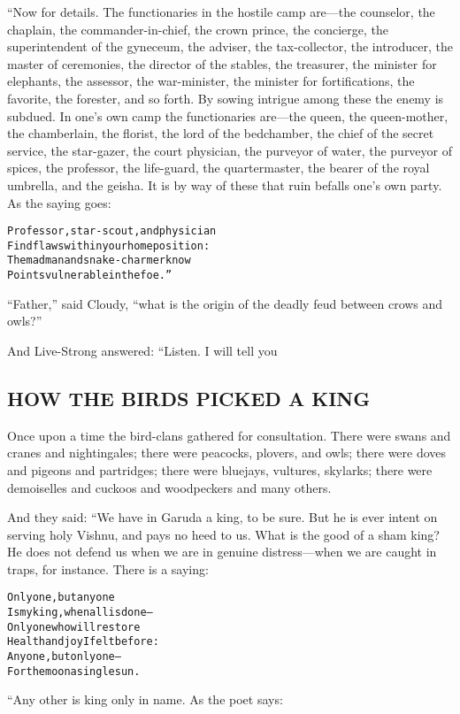 \documentclass{article}
\renewenvironment{verbatim}{\begin{alltt}\normalfont\begin{centering}}{\end{centering}\end{alltt}}
\begin{document}
“Now for details. The functionaries in the hostile camp are---the
counselor, the chaplain, the commander-in-chief, the crown prince,
the concierge, the superintendent of the gyneceum, the adviser, the
tax-collector, the introducer, the master of ceremonies, the
director of the stables, the treasurer, the minister for elephants,
the assessor, the war-minister, the minister for fortifications,
the favorite, the forester, and so forth. By sowing intrigue among
these the enemy is subdued. In one's own camp the functionaries
are---the queen, the queen-mother, the chamberlain, the florist,
the lord of the bedchamber, the chief of the secret service, the
star-gazer, the court physician, the purveyor of water, the
purveyor of spices, the professor, the life-guard, the
quartermaster, the bearer of the royal umbrella, and the geisha. It
is by way of these that ruin befalls one's own party. As the saying
goes:

\begin{verbatim}
Professor, star-scout, and physician
Find flaws within your home position:
The madman and snake-charmer know
Points vulnerable in the foe.”
\end{verbatim}
``Father,'' said Cloudy,
``what is the origin of the deadly feud between crows and owls?''

And Live-Strong answered: “Listen. I will tell you

\subsection{HOW THE BIRDS PICKED A KING}

Once upon a time the bird-clans gathered for consultation. There
were swans and cranes and nightingales; there were peacocks,
plovers, and owls; there were doves and pigeons and partridges;
there were bluejays, vultures, skylarks; there were demoiselles and
cuckoos and woodpeckers and many others.

And they said: “We have in Garuda a king, to be sure. But he is
ever intent on serving holy Vishnu, and pays no heed to us. What is
the good of a sham king? He does not defend us when we are in
genuine distress---when we are caught in traps, for instance. There
is a saying:

\begin{verbatim}
Only one, but anyone
Is my king, when all is done--
Only one who will restore
Health and joy I felt before:
Anyone, but only one--
For the moon a single sun.
\end{verbatim}
“Any other is king only in name. As the poet says:
\end{document}
